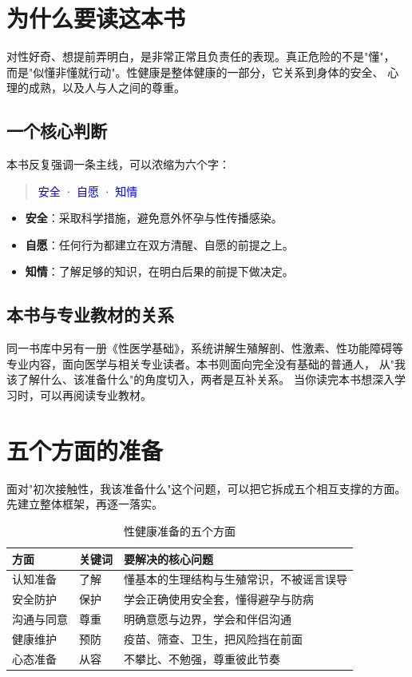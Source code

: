 \chapter{为什么要读这本书}

对性好奇、想提前弄明白，是非常正常且负责任的表现。真正危险的不是"懂"，
而是"似懂非懂就行动"。性健康是整体健康的一部分，它关系到身体的安全、
心理的成熟，以及人与人之间的尊重。

\section{一个核心判断}

本书反复强调一条主线，可以浓缩为六个字：

\begin{quote}
\centering \myhei{}\textcolor{blue}{安全 · 自愿 · 知情}
\end{quote}

\begin{itemize}
  \item \textbf{安全}：采取科学措施，避免意外怀孕与性传播感染。
  \item \textbf{自愿}：任何行为都建立在双方清醒、自愿的前提之上。
  \item \textbf{知情}：了解足够的知识，在明白后果的前提下做决定。
\end{itemize}

\section{本书与专业教材的关系}

同一书库中另有一册《性医学基础》，系统讲解生殖解剖、性激素、性功能障碍等
专业内容，面向医学与相关专业读者。本书则面向完全没有基础的普通人，
从"我该了解什么、该准备什么"的角度切入，两者是互补关系。
当你读完本书想深入学习时，可以再阅读专业教材。

\chapter{五个方面的准备}

面对"初次接触性，我该准备什么"这个问题，可以把它拆成五个相互支撑的方面。
先建立整体框架，再逐一落实。

\begin{table}[htbp]
  \centering
  \caption{性健康准备的五个方面}
  \begin{tabularx}{\textwidth}{@{}l l X@{}}
    \toprule
    \textbf{方面} & \textbf{关键词} & \textbf{要解决的核心问题} \\
    \midrule
    认知准备   & 了解       & 懂基本的生理结构与生殖常识，不被谣言误导 \\
    安全防护   & 保护       & 学会正确使用安全套，懂得避孕与防病 \\
    沟通与同意 & 尊重       & 明确意愿与边界，学会和伴侣沟通 \\
    健康维护   & 预防       & 疫苗、筛查、卫生，把风险挡在前面 \\
    心态准备   & 从容       & 不攀比、不勉强，尊重彼此节奏 \\
    \bottomrule
  \end{tabularx}
\end{table}

